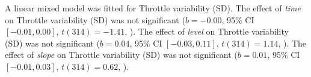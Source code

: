 A linear mixed model was fitted for Throttle variability (SD).
The effect of \textit{time} on Throttle variability (SD) was not significant ($b = -0.00$, 95\% CI $[-0.01, 0.00]$, $t(314) = -1.41$, ).
The effect of \textit{level} on Throttle variability (SD) was not significant ($b = 0.04$, 95\% CI $[-0.03, 0.11]$, $t(314) = 1.14$, ).
The effect of \textit{slope} on Throttle variability (SD) was not significant ($b = 0.01$, 95\% CI $[-0.01, 0.03]$, $t(314) = 0.62$, ).
